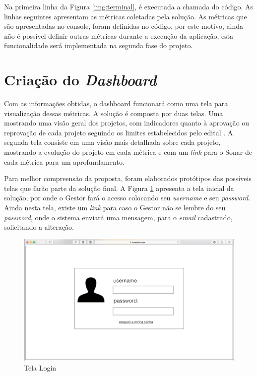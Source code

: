 Na primeira linha da Figura \ref{img:terminal}, é executada a chamada do código. As linhas seguintes apresentam as métricas coletadas pela solução. As métricas que são apresentadas no console, foram definidas no código, por este motivo, ainda não é possível definir outras métricas durante a execução da aplicação, esta funcionalidade será implementada na segunda fase do projeto. 

\section{Criação do \textit{Dashboard}}
Com as informações obtidas, o dashboard funcionará como uma tela para visualização dessas métricas. A solução é composta por duas telas. Uma mostrando uma visão geral dos projetos, com indicadores quanto à aprovação ou reprovação de cada projeto seguindo os limites estabelecidos pelo edital \cite{edital}. A segunda tela consiste em uma visão mais detalhada sobre cada projeto, mostrando a evolução do projeto em cada métrica e com um \textit{link} para o Sonar de cada métrica para um aprofundamento.

Para melhor compreensão da proposta, foram elaborados protótipos das possíveis telas que farão parte da solução final. A Figura \ref{img:telaLogin} apresenta a tela inicial da solução, por onde o Gestor fará o acesso colocando seu \textit{username} e seu \textit{password}. Ainda nesta tela, existe um \textit{link} para caso o Gestor não se lembre do seu \textit{password}, onde o sistema enviará uma mensagem, para o \textit{email} cadastrado, solicitando a alteração.

\graphicspath{{figuras/}}
\begin{figure}
\centering
\includegraphics[scale=0.60]{telaLogin.png}
\caption{Tela Login}
\label{img:telaLogin}
\end{figure}

